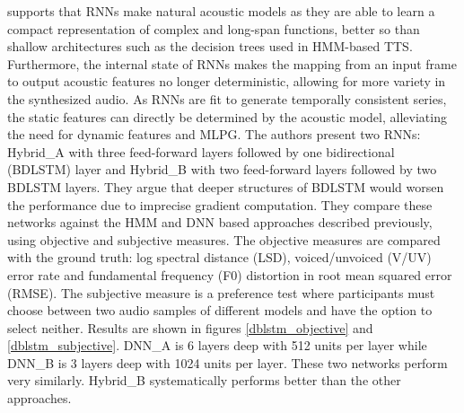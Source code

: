 \documentclass[a4paper, oneside]{article}
\begin{document}
\citep{BDLSTMTTS} supports that RNNs make natural acoustic models as they are able to learn a compact representation of complex and long-span functions, better so than shallow architectures such as the decision trees used in HMM-based TTS. Furthermore, the internal state of RNNs makes the mapping from an input frame to output acoustic features no longer deterministic, allowing for more variety in the synthesized audio. As RNNs are fit to generate temporally consistent series, the static features can directly be determined by the acoustic model, alleviating the need for dynamic features and MLPG. The authors present two RNNs: Hybrid\_A with three feed-forward layers followed by one bidirectional (BDLSTM) layer and Hybrid\_B with two feed-forward layers followed by two BDLSTM layers. They argue that deeper structures of BDLSTM would worsen the performance due to imprecise gradient computation. They compare these networks against the HMM and DNN based approaches described previously, using objective and subjective measures. The objective measures are compared with the ground truth: log spectral distance (LSD), voiced/unvoiced (V/UV) error rate and fundamental frequency (F0) distortion in root mean squared error (RMSE). The subjective measure is a preference test where participants must choose between two audio samples of different models and have the option to select neither. Results are shown in figures \ref{dblstm_objective} and \ref{dblstm_subjective}. DNN\_A is 6 layers deep with 512 units per layer while DNN\_B is 3 layers deep with 1024 units per layer. These two networks perform very similarly. Hybrid\_B systematically performs better than the other approaches.

\end{document}
